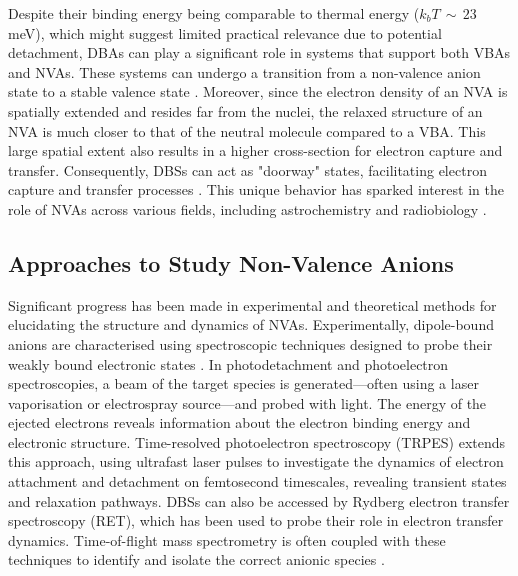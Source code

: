 Despite their binding energy being comparable to thermal energy ($k_bT\,\sim\,23$ meV), which might suggest limited practical relevance due to potential detachment, DBAs can play a significant role in systems that support both VBAs and NVAs. These systems can undergo a transition from a non-valence anion state to a stable valence state \cite{herbert2015quantum,jordan2003theory}. Moreover, since the electron density of an NVA is spatially extended and resides far from the nuclei, the relaxed structure of an NVA is much closer to that of the neutral molecule compared to a VBA. This large spatial extent also results in a higher cross-section for electron capture and transfer. Consequently, DBSs can act as "doorway" states, facilitating electron capture and transfer processes \cite{hendricks1998dipole,desfrancois1999electron,sommerfeld2002coupling,jordan2003theory,sommerfeld2004intramolecular,sommerfeld2005dipole,sommerfeld2007doorway,simons2008molecular,verlet2020role,kang2022state,hassan2022associative,simons2023molecular,kang2024reaction}. This unique behavior has sparked interest in the role of NVAs across various fields, including astrochemistry \cite{fortenberry2015interstellar,millar2017negative} and radiobiology \cite{gu2012interactions,narayanan2023secondary,sedmidubska2024interaction}.

\subsection{Approaches to Study Non-Valence Anions}
Significant progress has been made in experimental and theoretical methods for elucidating the structure and dynamics of NVAs. \cite{desfranccois1995determination,simons2008molecular,simons2023molecular,clarke2024dynamics} Experimentally, dipole-bound anions are characterised using spectroscopic techniques designed to probe their weakly bound electronic states \cite{rienstra2002atomic,liu2020photoelectron,simons2008molecular,rogers2019photoelectron,clarke2024dynamics}. In photodetachment and photoelectron spectroscopies, a beam of the target species is generated—often using a laser vaporisation or electrospray source—and probed with light. The energy of the ejected electrons reveals information about the electron binding energy and electronic structure. Time-resolved photoelectron spectroscopy (TRPES)\cite{cyr1996femtosecond,neumark2001time,stolow2004femtosecond,wu2011time,schuurman2022time} extends this approach, using ultrafast laser pulses to investigate the dynamics of electron attachment and detachment on femtosecond timescales, revealing transient states and relaxation pathways. DBSs can also be accessed by Rydberg electron transfer spectroscopy (RET)\cite{carles2001rydberg,eustis2007photoelectron,bradforth2002excited}, which has been used to probe their role in electron transfer dynamics. Time-of-flight mass spectrometry is often coupled with these techniques to identify and isolate the correct anionic species \cite{desfranccois1996abdoul,liu2019ground,ameixa2023parent,pshenichnyuk2020ionizing}.

